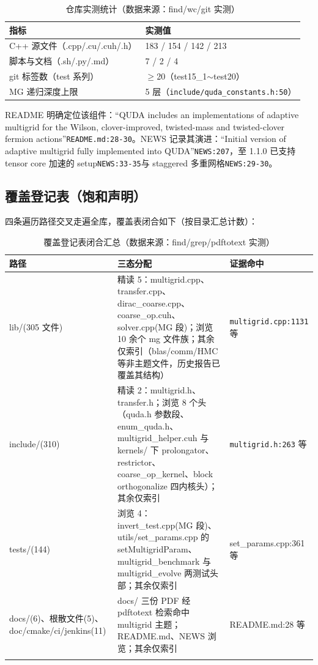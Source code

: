 \documentclass[UTF8]{ctexart}
\begin{document}
\begin{table}[htbp]\centering
\begin{tabular}{ll}
\toprule
指标 & 实测值 \\
\midrule
C++ 源文件（.cpp/.cu/.cuh/.h） & 183 / 154 / 142 / 213 \\
脚本与文档（.sh/.py/.md） & 7 / 2 / 4 \\
git 标签数（test 系列） & $\ge$20（test15\_1$\sim$test20） \\
MG 递归深度上限 & 5 层（\texttt{\nolinkurl{include/quda_constants.h:50}}） \\
\bottomrule
\end{tabular}
\caption{仓库实测统计（数据来源：find/wc/git 实测）}
\end{table}

README 明确定位该组件：``QUDA includes an implementations of adaptive multigrid for the Wilson, clover-improved, twisted-mass and twisted-clover fermion actions''\textcolor{evidence}{\texttt{\nolinkurl{README.md:28-30}}}。NEWS 记录其演进：``Initial version of adaptive multigrid fully implemented into QUDA''\textcolor{evidence}{\texttt{\nolinkurl{NEWS:207}}}，至 1.1.0 已支持 tensor core 加速的 setup\textcolor{evidence}{\texttt{\nolinkurl{NEWS:33-35}}}与 staggered 多重网格\textcolor{evidence}{\texttt{\nolinkurl{NEWS:29-30}}}。

\subsection{覆盖登记表（饱和声明）}

四条遍历路径交叉走遍全库，覆盖表闭合如下（按目录汇总计数）：

\begin{xltabular}{\textwidth}{lXX}
\toprule
路径 & 三态分配 & 证据命中 \\
\midrule
\endhead
lib/(305 文件) & 精读 5：multigrid.cpp、transfer.cpp、dirac\_coarse.cpp、coarse\_op.cuh、solver.cpp(MG 段)；浏览 10 余个 mg 文件族；其余仅索引（blas/comm/HMC 等非主题文件，历史报告已覆盖其结构） & \textcolor{evidence}{\texttt{\nolinkurl{multigrid.cpp:1131}}} 等 \\
include/(310) & 精读 2：multigrid.h、transfer.h；浏览 8 个头（quda.h 参数段、enum\_quda.h、multigrid\_helper.cuh 与 kernels/ 下 prolongator、restrictor、coarse\_op\_kernel、block orthogonalize 四内核头）；其余仅索引 & \textcolor{evidence}{\texttt{\nolinkurl{multigrid.h:263}}} 等 \\
tests/(144) & 浏览 4：invert\_test.cpp(MG 段)、utils/set\_params.cpp 的 setMultigridParam、multigrid\_benchmark 与 multigrid\_evolve 两测试头部；其余仅索引 & set\_params.cpp:361 等 \\
docs/(6)、根散文件(5)、doc/cmake/ci/jenkins(11) & docs/ 三份 PDF 经 pdftotext 检索命中 multigrid 主题；README.md、NEWS 浏览；其余仅索引 & README.md:28 等 \\
\bottomrule
\caption{覆盖登记表闭合汇总（数据来源：find/grep/pdftotext 实测）}
\end{xltabular}
\end{document}
